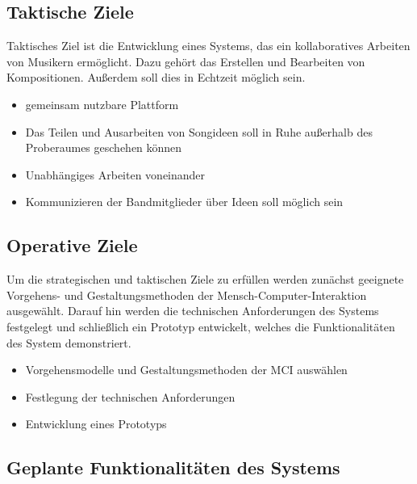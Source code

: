 \documentclass[12pt]{scrartcl}
\begin{document}
\subsection{Taktische Ziele}

Taktisches Ziel ist die Entwicklung eines Systems, das ein kollaboratives Arbeiten von Musikern ermöglicht. Dazu gehört das Erstellen und Bearbeiten von Kompositionen. Außerdem soll dies in Echtzeit möglich sein.
\begin{itemize}
\item gemeinsam nutzbare Plattform
\item Das Teilen und Ausarbeiten von Songideen soll in Ruhe außerhalb des Proberaumes geschehen können
\item Unabhängiges Arbeiten voneinander
\item Kommunizieren der Bandmitglieder über Ideen soll möglich sein
\
\end{itemize}

\subsection{Operative Ziele}

Um die strategischen und taktischen Ziele zu erfüllen werden zunächst geeignete Vorgehens- und Gestaltungsmethoden der Mensch-Computer-Interaktion ausgewählt. Darauf hin werden die technischen Anforderungen des Systems festgelegt und schließlich ein Prototyp entwickelt, welches die Funktionalitäten des System demonstriert.

\begin{itemize}
\item Vorgehensmodelle und Gestaltungsmethoden der MCI auswählen
\item Festlegung der technischen Anforderungen
\item Entwicklung eines Prototyps 
\end{itemize}

\subsection[Geplante Funktionalitäten]{Geplante Funktionalitäten des Systems}
\end{document}
